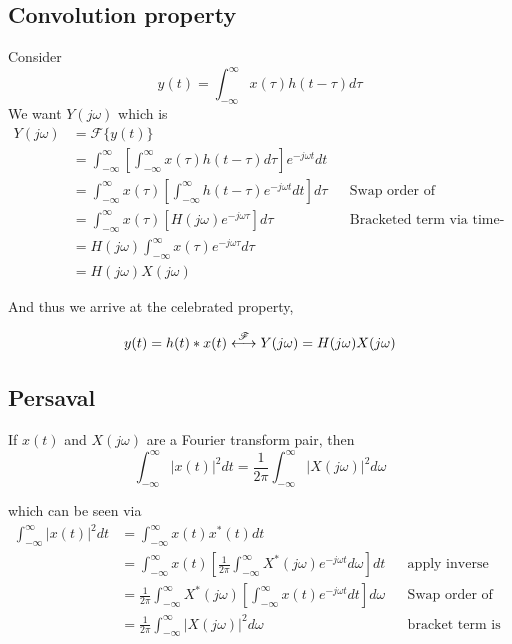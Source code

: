 \subsection{Convolution property}
Consider 
\[
y(t) = \int_{-\infty}^{\infty}x(\tau) h(t-\tau) d\tau
\]
We want $Y(j\omega)$ which is 
\begin{align}
Y(j\omega) &= \mathscr{F} \{ y(t) \} \\
&= \int_{-\infty}^{\infty} \left[ \int_{-\infty}^{\infty}x(\tau) h(t-\tau) d\tau \right]  e^{-j \omega t} dt \\
& = \int_{-\infty}^{\infty} x(\tau) \left[ \int_{-\infty}^{\infty}h(t-\tau) e^{-j\omega t} dt \right]  d\tau && \text{Swap order of integration}\\
& = \int_{-\infty}^{\infty} x(\tau) \left[ H(j\omega) e^{-j\omega \tau} \right] d\tau  && \text{Bracketed term via time-shifting}\\
& = H(j\omega) \int_{-\infty}^{\infty} x(\tau) e^{-j\omega \tau} d\tau \\
& = H(j\omega) X(j\omega) 
\end{align}


And thus we arrive at the celebrated property, 


\[
y(t) = h(t) * x(t) \stackrel{\mathscr{F}}{\longleftrightarrow} Y(j\omega) = H(j\omega) X(j\omega)  
\]


\subsection{Persaval}
If $x(t)$ and $X(j\omega)$ are a Fourier transform pair, then
\[
\int_{-\infty}^{\infty} | x(t) | ^2 dt = \frac{1}{2\pi} \int_{-\infty}^{\infty} |X(j\omega)| ^2 d\omega
\]

which can be seen via 
\begin{align}
  \int_{-\infty}^{\infty} |x(t)|^2 dt  &= \int_{-\infty}^{\infty} x(t)x^*(t) dt \\
  &= \int_{-\infty}^{\infty} x(t) \left[ \frac{1}{2\pi} \int_{-\infty}^{\infty} X^*(j\omega) e^{-j\omega t} d\omega \right] dt && \text{apply inverse FT} \\
  &=  \frac{1}{2\pi} \int_{-\infty}^{\infty} X^*(j\omega) \left[ \int_{-\infty}^{\infty} x(t) e^{-j\omega t} dt \right] d\omega && \text{Swap order of integration}\\
&= \frac{1}{2\pi} \int_{-\infty}^{\infty} |X(j\omega)| ^2 d\omega && \text{bracket term is FT} \\ 
\end{align}

